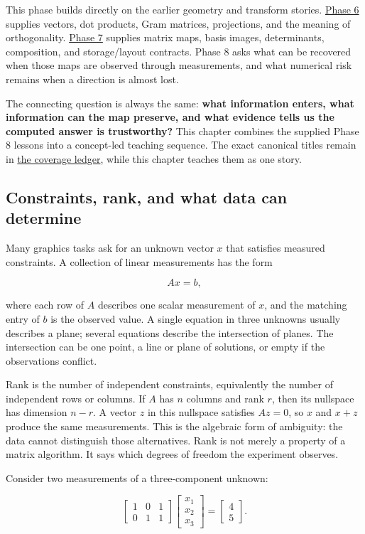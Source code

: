 This phase builds directly on the earlier geometry and transform stories. \hyperref[01-foundations-i-ch017]{Phase 6} supplies vectors, dot products, Gram matrices, projections, and the meaning of orthogonality. \hyperref[01-foundations-i-ch018]{Phase 7} supplies matrix maps, basis images, determinants, composition, and storage/layout contracts. Phase 8 asks what can be recovered when those maps are observed through measurements, and what numerical risk remains when a direction is almost lost.

The connecting question is always the same: \textbf{what information enters, what information can the map preserve, and what evidence tells us the computed answer is trustworthy?} This chapter combines the supplied Phase 8 lessons into a concept-led teaching sequence. The exact canonical titles remain in \hyperref[appendix-fd090d982a15]{the coverage ledger}, while this chapter teaches them as one story.

\subsection{Constraints, rank, and what data can determine}\label{constraints-rank-and-what-data-can-determine}

Many graphics tasks ask for an unknown vector \(x\) that satisfies measured constraints. A collection of linear measurements has the form

\[
Ax=b,
\]

where each row of \(A\) describes one scalar measurement of \(x\), and the matching entry of \(b\) is the observed value. A single equation in three unknowns usually describes a plane; several equations describe the intersection of planes. The intersection can be one point, a line or plane of solutions, or empty if the observations conflict.

Rank is the number of independent constraints, equivalently the number of independent rows or columns. If \(A\) has \(n\) columns and rank \(r\), then its nullspace has dimension \(n-r\). A vector \(z\) in this nullspace satisfies \(Az=0\), so \(x\) and \(x+z\) produce the same measurements. This is the algebraic form of ambiguity: the data cannot distinguish those alternatives. Rank is not merely a property of a matrix algorithm. It says which degrees of freedom the experiment observes.

Consider two measurements of a three-component unknown:

\[
\begin{bmatrix}1&0&1\\0&1&1\end{bmatrix}
\begin{bmatrix}x_1\\x_2\\x_3\end{bmatrix}
=
\begin{bmatrix}4\\5\end{bmatrix}.
\]

